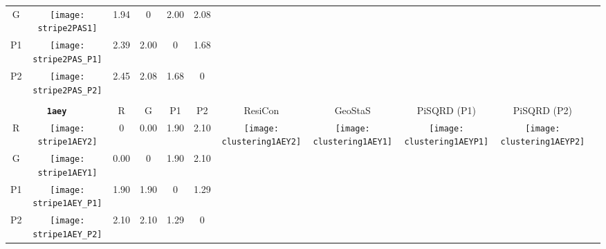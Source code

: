 \documentclass[a4paper,11pt,twoside]{book}%
\begin{document}
\begin{appendices}
\begin{sidewaystable}[h!]
\begin{tabular*}{4cm}{cc|c|c|c|c|c|c|c|c|c|}
\cline{1-6}
\multicolumn{1}{|c|}{G} & \texttt{[image: stripe2PAS1]} & 1.94 & 0 & 2.00 & 2.08 & \multirow{4}{*}{} & \multirow{4}{*}{} & \multirow{4}{*}{} & \multirow{4}{*}{} & \multirow{5}{*}{} \\
\cline{1-6}
\multicolumn{1}{|c|}{P1} & \texttt{[image: stripe2PAS\_P1]} & 2.39 & 2.00 & 0 & 1.68 & \multirow{4}{*}{} & \multirow{4}{*}{} & \multirow{4}{*}{} & \multirow{4}{*}{} & \multirow{5}{*}{}  \\
\cline{1-6}
\multicolumn{1}{|c|}{P2} & \texttt{[image: stripe2PAS\_P2]} & 2.45 & 2.08 & 1.68 & 0 & \multirow{4}{*}{} & \multirow{4}{*}{} & \multirow{4}{*}{} & \multirow{4}{*}{} & \multirow{5}{*}{}  \\
\cline{1-11}
\\
\cline{1-11}
\multicolumn{2}{|c|}{{\bf \texttt{1aey}}} & R & G & P1 & P2 & ResiCon & GeoStaS & PiSQRD (P1) & PiSQRD (P2) & \multirow{5}{*}{\vspace{-0.15cm}\texttt{[image: threeHistogram1AEY]}}  \\
\cline{1-10}
\multicolumn{1}{|c|}{R} & \texttt{[image: stripe1AEY2]} & 0 & 0.00 & 1.90 & 2.10 & \multirow{4}{*}{\vspace{-0.3cm}\texttt{[image: clustering1AEY2]}} & \multirow{4}{*}{\vspace{-0.3cm}\texttt{[image: clustering1AEY1]}} & \multirow{4}{*}{\vspace{-0.3cm}\texttt{[image: clustering1AEYP1]}} & \multirow{4}{*}{\vspace{-0.3cm}\texttt{[image: clustering1AEYP2]}} &  \multirow{5}{*}{} \\
\cline{1-6}
\multicolumn{1}{|c|}{G} & \texttt{[image: stripe1AEY1]} & 0.00 & 0 & 1.90 & 2.10 & \multirow{4}{*}{} & \multirow{4}{*}{} & \multirow{4}{*}{} & \multirow{4}{*}{} & \multirow{5}{*}{} \\
\cline{1-6}
\multicolumn{1}{|c|}{P1} & \texttt{[image: stripe1AEY\_P1]} & 1.90 & 1.90 & 0 & 1.29 & \multirow{4}{*}{} & \multirow{4}{*}{} & \multirow{4}{*}{} & \multirow{4}{*}{} & \multirow{5}{*}{}  \\
\cline{1-6}
\multicolumn{1}{|c|}{P2} & \texttt{[image: stripe1AEY\_P2]} & 2.10 & 2.10 & 1.29 & 0 & \multirow{4}{*}{} & \multirow{4}{*}{} & \multirow{4}{*}{} & \multirow{4}{*}{} & \multirow{5}{*}{}  \\
\cline{1-11}
\end{tabular*}
\normalfont
\end{sidewaystable}




\end{appendices}
\end{document}
